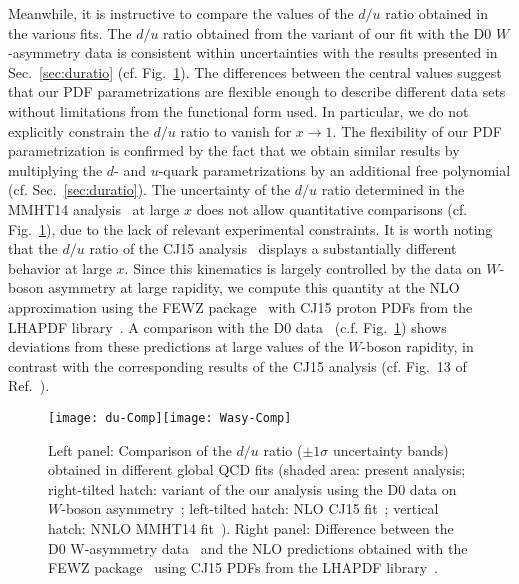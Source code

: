 \documentclass[%
      aps,
      prd,
      floatfix,
      preprintnumbers,
      preprint,
      showpacs,
      nofootinbib,
      tightenlines,
      amssymb,
      amsmath
]{revtex4-1}
\begin{document}
Meanwhile, it is instructive to compare the values of the $d/u$ ratio obtained in the various fits.  
The $d/u$ ratio obtained from the variant of our fit with the D0 $W$-asymmetry data is 
consistent within uncertainties with the results presented in Sec.~\ref{sec:duratio} (cf. Fig.~\ref{fig:CJ15du}). 
The differences between the central values suggest that our PDF parametrizations are flexible enough 
to describe different data sets without limitations from the functional form used. 
In particular, we do not 
explicitly constrain the $d/u$ ratio to vanish for $x\to 1$.   
The flexibility of our PDF parametrization is confirmed by the fact that we obtain 
similar results by multiplying the $d$- and $u$-quark parametrizations by an 
additional free polynomial (cf. Sec.~\ref{sec:duratio}). 
% 
The uncertainty of the $d/u$ ratio determined in the MMHT14 analysis~\cite{Harland-Lang:2014zoa} 
at large $x$ does not allow quantitative comparisons (cf. Fig.~\ref{fig:CJ15du}), 
due to the lack of relevant experimental constraints.
% 
It is worth noting that the $d/u$ ratio of the CJ15 analysis~\cite{Accardi:2016qay} 
displays a substantially different behavior at large $x$. 
Since this kinematics is largely controlled by the data on $W$-boson asymmetry at large rapidity, 
we compute this quantity at the NLO approximation using the FEWZ 
package~\cite{Li:2012wna,Gavin:2012sy} with CJ15 proton PDFs from the LHAPDF library~\cite{Buckley:2014ana}. 
A comparison with the D0 data~\cite{Abazov:2013dsa} (c.f. Fig.~\ref{fig:CJ15du})  
shows deviations from these predictions at large values of the 
$W$-boson rapidity, in contrast with the corresponding results of the CJ15 analysis 
(cf. Fig.~13 of Ref.~\cite{Accardi:2016qay}). 


\begin{figure}[tb] %
\begin{center}
\texttt{[image: du-Comp]}\texttt{[image: Wasy-Comp]}
\caption{%
Left panel: Comparison of the $d/u$ ratio ($\pm 1 \sigma$ uncertainty bands)
obtained in different global QCD fits 
(shaded area: present analysis; right-tilted hatch: variant of the our analysis using 
the D0 data on $W$-boson asymmetry~\cite{Abazov:2013dsa}; left-tilted hatch: 
NLO CJ15 fit~\cite{Accardi:2016qay}; vertical hatch: NNLO MMHT14 fit~\cite{Harland-Lang:2014zoa}). 
Right panel: Difference between the D0 W-asymmetry data~\cite{Abazov:2013dsa} and the NLO predictions obtained 
with the FEWZ package~\cite{Li:2012wna,Gavin:2012sy} using CJ15 
PDFs from the LHAPDF library~\cite{Buckley:2014ana}.  
}
\label{fig:CJ15du}
\end{center}
\end{figure}
\end{document}
